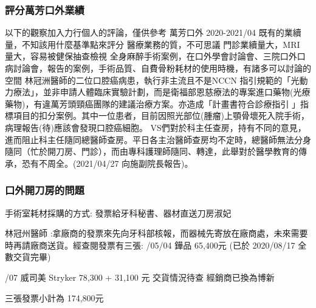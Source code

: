 \documentclass[t,24pt,aspectratio=169]{beamer}
\begin{document}
\begin{frame}[hoved]
\frametitle{評分萬芳口外業績}
\begin{outline}
\1 以下的觀察加入力行個人的評論，僅供參考
    \2 萬芳口外 2020-2021/04 既有的業續量，不知該用什麼基準點來評分
    \2 醫療業務的質，不可思議
        \3 門診業續量大，MRI 量大，容易被健保抽查檢視
        \3 全身麻醉手術案例，在口外學會討論會、三院口外口病討論會，報告的案例，手術品質、自費骨粉耗材的使用時機，有諸多可以討論的空間
        \3 林冠洲醫師的二位口腔癌病患，執行非主流且不是NCCN 指引規範的「光動力療法」，並非申請人體臨床實驗計劃，而是衛福部恩慈療法的專案進口藥物(光療藥物)，有違萬芳頭頸癌團隊的建議治療方案。亦造成「計畫書符合診療指引 」指標項目的扣分案例。其中一位患者，目前因照光部位(腫瘤)上顎骨壞死入院手術，病理報告(待)應該會發現口腔癌細胞。
        \3 VS們對於科主任查房，持有不同的意見，進而阻止科主任隨同總醫師查房。平日各主治醫師查房均不定時，總醫師無法分身隨同（忙於開刀房、門診），而由專科護理師隨同、轉達，此舉對於醫學教育的傳承，恐有不周全。(2021/04/27 向施副院長報告)。
    
\end{outline}


\end{frame}

\begin{frame}[hoved]
\frametitle{口外開刀房的問題}
手術室耗材採購的方式: 發票給牙科秘書、器材直送刀房淑妃




\begin{outline}
\1 林冠州醫師 :拿廠商的發票來先向牙科部核報，而器械先寄放在廠商處，未來需要時再請廠商送貨。經查閱發票有三張:
/05/04 鏵品 65,400元 (已於 2020/08/17 全數交貨完畢)

/07 威司美 Stryker 78,300 + 31,100 元
    \3 交貨情況待查
     經銷商已換為博新

\1 三張發票小計為 174,800元

\end{outline}



\end{frame}
\end{document}
